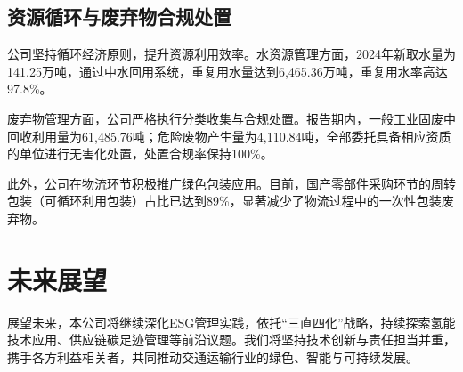 \documentclass[a4paper,12pt]{article}
\begin{document}
\subsection{资源循环与废弃物合规处置}

公司坚持循环经济原则，提升资源利用效率。水资源管理方面，2024年新取水量为141.25万吨，通过中水回用系统，重复用水量达到6,465.36万吨，重复用水率高达97.8\%。

废弃物管理方面，公司严格执行分类收集与合规处置。报告期内，一般工业固废中回收利用量为61,485.76吨；危险废物产生量为4,110.84吨，全部委托具备相应资质的单位进行无害化处置，处置合规率保持100\%。

此外，公司在物流环节积极推广绿色包装应用。目前，国产零部件采购环节的周转包装（可循环利用包装）占比已达到89\%，显著减少了物流过程中的一次性包装废弃物。

\section{未来展望}

展望未来，本公司将继续深化ESG管理实践，依托“三直四化”战略，持续探索氢能技术应用、供应链碳足迹管理等前沿议题。我们将坚持技术创新与责任担当并重，携手各方利益相关者，共同推动交通运输行业的绿色、智能与可持续发展。

\vspace{2cm}
\end{document}
